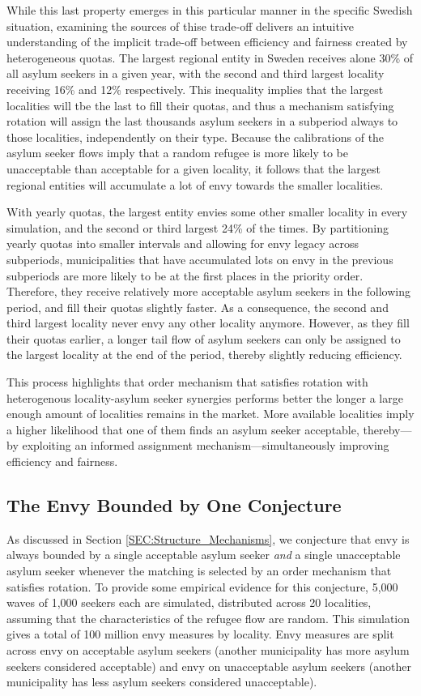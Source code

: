 \documentclass[12pt,fleqn]{article}
\begin{document}
While this last property emerges in this particular manner in the specific Swedish situation, examining the sources of thise trade-off delivers an intuitive understanding of the implicit trade-off between efficiency and fairness created by heterogeneous quotas. The largest regional entity in Sweden receives alone 30\% of all asylum seekers in a given year, with the second and third largest locality receiving 16\% and 12\% respectively. This inequality implies that the largest localities will tbe the last to fill their quotas, and thus a mechanism satisfying rotation will assign the last thousands asylum seekers in a subperiod always to those localities, independently on their type. Because the calibrations of the asylum seeker flows imply that a random refugee is more likely to be unacceptable than acceptable for a given locality, it follows that the largest regional entities will accumulate a lot of envy towards the smaller localities.

With yearly quotas, the largest entity envies some other smaller locality in every simulation, and the second or third largest 24\% of the times. By partitioning yearly quotas into smaller intervals and allowing for envy legacy across subperiods, municipalities that have accumulated lots on envy in the previous subperiods are more likely to be at the first places in the priority order. Therefore, they receive relatively more acceptable asylum seekers in the following period, and fill their quotas slightly faster. As a consequence, the second and third largest locality never envy any other locality anymore. However, as they fill their quotas earlier, a longer tail flow of asylum seekers can only be assigned to the largest locality at the end of the period, thereby slightly reducing efficiency. 

This process highlights that order mechanism that satisfies rotation with heterogenous locality-asylum seeker synergies performs better the longer a large enough amount of localities remains in the market. More available localities imply a higher likelihood that one of them finds an asylum seeker acceptable, thereby---by exploiting an informed assignment mechanism---simultaneously improving efficiency and fairness.

\subsection{The Envy Bounded by One Conjecture}
As discussed in Section \ref{SEC:Structure_Mechanisms}, we conjecture that envy is always bounded by a single acceptable asylum seeker \emph{and} a single unacceptable asylum seeker whenever the matching is selected by an order mechanism that satisfies rotation. To provide some empirical evidence for this conjecture, 5,000 waves of 1,000 seekers each are simulated, distributed across 20 localities, assuming that the characteristics of the refugee flow are random. This simulation gives a total of 100 million envy measures by locality. Envy measures are split across envy on acceptable asylum seekers (another municipality has more asylum seekers considered acceptable) and envy on unacceptable asylum seekers (another municipality has less asylum seekers considered unacceptable). 
\end{document}
